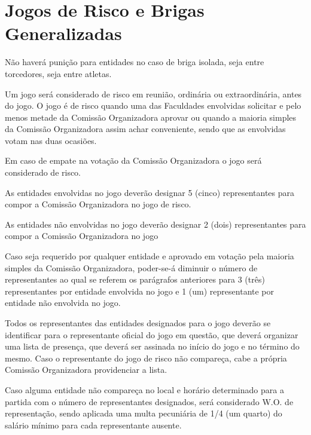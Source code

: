 {\let\clearpage\relax \chapter{Jogos de Risco e Brigas Generalizadas}}

\begin{article}
	Não haverá punição para entidades no caso de briga isolada, seja entre torcedores, seja entre atletas.
\end{article}

\begin{article}
	Um jogo será considerado de risco em reunião, ordinária ou extraordinária, antes do jogo. O jogo é de risco quando uma das Faculdades envolvidas solicitar e pelo menos metade da Comissão Organizadora aprovar ou quando a maioria simples da Comissão Organizadora assim achar conveniente, sendo que as envolvidas votam nas duas ocasiões.
	
	\begin{xparagraph}
	Em caso de empate na votação da Comissão Organizadora o jogo será considerado de risco.
	\end{xparagraph}
	
	\begin{xparagraph}
	As entidades envolvidas no jogo deverão designar 5 (cinco) representantes para compor a Comissão Organizadora no jogo de risco.
	\end{xparagraph}
	
	\begin{xparagraph}
	As entidades não envolvidas no jogo deverão designar 2 (dois) representantes para compor a Comissão Organizadora no jogo
	\end{xparagraph}
	
	\begin{xparagraph}
	Caso seja requerido por qualquer entidade e aprovado em votação pela maioria simples da Comissão Organizadora, poder-se-á diminuir o número de representantes ao qual se referem os parágrafos anteriores para 3 (três) representantes por entidade envolvida no jogo e 1 (um) representante por entidade não envolvida no jogo.
	\end{xparagraph}
	
	\begin{xparagraph}
	Todos os representantes das entidades designados para o jogo deverão se identificar para o representante oficial do jogo em questão, que deverá organizar uma lista de presença, que deverá ser assinada no início do jogo e no término do mesmo. Caso o representante do jogo de risco não compareça, cabe a própria Comissão Organizadora providenciar a lista.
	\end{xparagraph}
	
	\begin{xparagraph}
	Caso alguma entidade não compareça no local e horário determinado para a partida com o número de representantes designados, será considerado W.O. de representação, sendo aplicada uma multa pecuniária de 1/4 (um quarto) do salário mínimo para cada representante ausente.
	\end{xparagraph}
\end{article}

